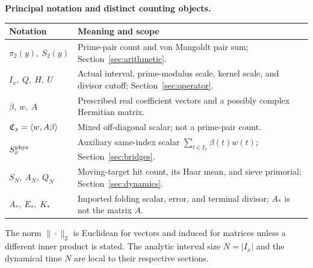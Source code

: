 \noindent\textbf{Principal notation and distinct counting objects.}
\begin{center}\small
\begin{tabularx}{\linewidth}{@{}p{.24\linewidth}X@{}}
\toprule
Notation & Meaning and scope\\\midrule
$\pi_2(y),\ S_2(y)$ & Prime-pair count and von Mangoldt pair sum; Section~\ref{sec:arithmetic}.\\
$I_x,\ Q,\ H,\ U$ & Actual interval, prime-modulus scale, kernel scale, and divisor cutoff; Section~\ref{sec:operator}.\\
$\beta,\ w,\ A$ & Prescribed real coefficient vectors and a possibly complex Hermitian matrix.\\
$\mathfrak C_x=\langle w,A\beta\rangle$ & Mixed off-diagonal scalar; not a prime-pair count.\\
$S_x^{\rm phys}$ & Auxiliary same-index scalar $\sum_{t\in I_x}\beta(t)w(t)$; Section~\ref{sec:bridges}.\\
$S_N,\ A_N,\ Q_N$ & Moving-target hit count, its Haar mean, and sieve primorial; Section~\ref{sec:dynamics}.\\
$A_*,\ E_*,\ K_*$ & Imported folding scalar, error, and terminal divisor; $A_*$ is not the matrix $A$.\\
\bottomrule
\end{tabularx}
\end{center}
\noindent The norm $\|\cdot\|_2$ is Euclidean for vectors and induced for matrices unless a different inner product is stated. The analytic interval size $N=|I_x|$ and the dynamical time $N$ are local to their respective sections.
